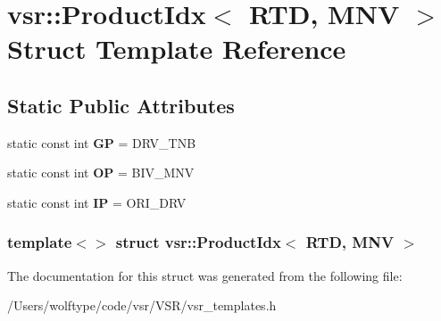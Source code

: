 \hypertarget{structvsr_1_1_product_idx_3_01_r_t_d_00_01_m_n_v_01_4}{\section{vsr\-:\-:Product\-Idx$<$ R\-T\-D, M\-N\-V $>$ Struct Template Reference}
\label{structvsr_1_1_product_idx_3_01_r_t_d_00_01_m_n_v_01_4}
}
\subsection*{Static Public Attributes}
\begin{DoxyCompactItemize}
\item 
\hypertarget{structvsr_1_1_product_idx_3_01_r_t_d_00_01_m_n_v_01_4_a25eb05ee115e2e83a36d0077a30a0f38}{static const int {\bfseries G\-P} = D\-R\-V\-\_\-\-T\-N\-B}\label{structvsr_1_1_product_idx_3_01_r_t_d_00_01_m_n_v_01_4_a25eb05ee115e2e83a36d0077a30a0f38}

\item 
\hypertarget{structvsr_1_1_product_idx_3_01_r_t_d_00_01_m_n_v_01_4_a75c2e1e9497e4e11871f4b99d4dae576}{static const int {\bfseries O\-P} = B\-I\-V\-\_\-\-M\-N\-V}\label{structvsr_1_1_product_idx_3_01_r_t_d_00_01_m_n_v_01_4_a75c2e1e9497e4e11871f4b99d4dae576}

\item 
\hypertarget{structvsr_1_1_product_idx_3_01_r_t_d_00_01_m_n_v_01_4_a417eada09fd80ac6e46e24fed42d6e69}{static const int {\bfseries I\-P} = O\-R\-I\-\_\-\-D\-R\-V}\label{structvsr_1_1_product_idx_3_01_r_t_d_00_01_m_n_v_01_4_a417eada09fd80ac6e46e24fed42d6e69}

\end{DoxyCompactItemize}
\subsubsection*{template$<$$>$ struct vsr\-::\-Product\-Idx$<$ R\-T\-D, M\-N\-V $>$}



The documentation for this struct was generated from the following file\-:\begin{DoxyCompactItemize}
\item 
/\-Users/wolftype/code/vsr/\-V\-S\-R/vsr\-\_\-templates.\-h\end{DoxyCompactItemize}
